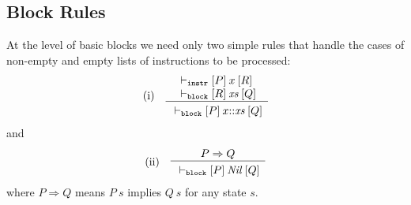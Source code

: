 \documentclass[sigplan,10pt,review]{acmart}\settopmatter{printfolios=true,printccs=false,printacmref=false}
\newcommand{\subpred}{\Rightarrow}
\newcommand{\ttrip}[5]{\mathit{#1} \vdash_{\mathrm{#2}}[#3]\:#4\:[#5]}
\newcommand{\RuleC}[2]{\begin{array}{c}#1\\\hline\noalign{\smallskip}#2\end{array}}
\begin{document}
\subsection{Block Rules}
\label{sec:block-rules}
At the level of basic blocks we need only two simple rules
that handle the cases of non-empty and empty lists of instructions
to be processed:
\[
\begin{array}{l l}
\mbox{(i)} & \RuleC{\begin{array}{l}\ttrip{}{\mathtt{instr}}{P}{x}{R} \\
                    \ttrip{}{\mathtt{block}}{R}{\mathit{xs}}{Q}
                    \end{array}}
                   {\ttrip{}{\mathtt{block}}{P}{x\mbox{::}\mathit{xs}}{Q}}
\end{array}
\]
and
\[
\begin{array}{l l}
\mbox{(ii)} & \RuleC{P \subpred Q} 
{\ttrip{}{\mathtt{block}}{P}{\mathit{Nil}}{Q}}
\end{array}
\]
where $P \subpred Q$ means $P\:s$ implies $Q\:s$ for any state $s$.
%
\end{document}
